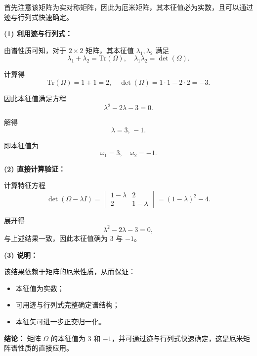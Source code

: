 \begin{solution}[利用迹与行列式求二阶厄米矩阵本征值]
\answer

首先注意该矩阵为实对称矩阵，因此为厄米矩阵，其本征值必为实数，且可以通过迹与行列式快速确定。

\vspace{0.3em}
\textbf{(1) 利用迹与行列式：}

由谱性质可知，对于 $2\times2$ 矩阵，其本征值 $\lambda_1,\lambda_2$ 满足
\[
\lambda_1+\lambda_2=\mathrm{Tr}(\Omega),\quad \lambda_1\lambda_2=\det(\Omega).
\]

计算得
\[
\mathrm{Tr}(\Omega)=1+1=2,\quad \det(\Omega)=1\cdot1-2\cdot2=-3.
\]

因此本征值满足方程
\[
\lambda^2-2\lambda-3=0.
\]

解得
\[
\lambda=3,\,-1.
\]

即本征值为
\[
\omega_1=3,\quad \omega_2=-1.
\]

\vspace{0.5em}
\textbf{(2) 直接计算验证：}

计算特征方程
\[
\det(\Omega-\lambda I)=
\begin{vmatrix}
1-\lambda & 2\\
2 & 1-\lambda
\end{vmatrix}
=(1-\lambda)^2-4.
\]

展开得
\[
\lambda^2-2\lambda-3=0,
\]
与上述结果一致，因此本征值确为 $3$ 与 $-1$。

\vspace{0.5em}
\textbf{(3) 说明：}

该结果依赖于矩阵的厄米性质，从而保证：
\begin{itemize}
\item 本征值为实数；
\item 可用迹与行列式完整确定谱结构；
\item 本征矢可进一步正交归一化。
\end{itemize}

\vspace{0.3em}
\textbf{结论：}
矩阵 $\Omega$ 的本征值为 $3$ 和 $-1$，并可通过迹与行列式快速确定，这是厄米矩阵谱性质的直接应用。
\end{solution}


